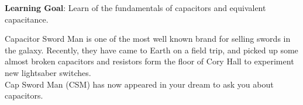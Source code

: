 

\textbf{Learning Goal}: Learn of the fundamentals of capacitors and equivalent capacitance.


Capacitor Sword Man is one of the most well known brand for selling swords in the galaxy. Recently, they have came to Earth on a field trip, and picked up some almost broken capacitors and resistors form the floor of Cory Hall to experiment new lightsaber switches. \\
Cap Sword Man (CSM) has now appeared in your dream to ask you about capacitors.

